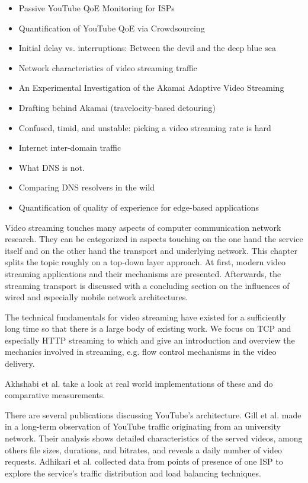 \begin{itemize}
	\item Passive YouTube QoE Monitoring for ISPs \cite{6296879}
	\item Quantification of YouTube QoE via Crowdsourcing \cite{6123395}
	\item Initial delay vs. interruptions: Between the devil and the deep blue sea \cite{6263849}
	\item Network characteristics of video streaming traffic \cite{Rao:2011:NCV:2079296.2079321}
	\item An Experimental Investigation of the Akamai Adaptive Video Streaming \cite{cicco2010akamai}
	\item Drafting behind Akamai (travelocity-based detouring) \cite{Su:2006:DBA:1159913.1159962}
	\item Confused, timid, and unstable: picking a video streaming rate is hard \cite{Huang:2012:CTU:2398776.2398800}
	\item Internet inter-domain traffic \cite{Labovitz:2010:IIT:2043164.1851194}
	\item What DNS is not. \cite{vixie2009dns}
	\item Comparing DNS resolvers in the wild \cite{ager2010comparing}
	\item Quantification of quality of experience for edge-based applications\cite{hossfeld2007quantification}
\end{itemize}

Video streaming touches many aspects of computer communication network research. They can be categorized in aspects touching on the one hand the service itself and on the other hand  the transport and underlying network. This chapter splits the topic roughly on a top-down layer approach. At first, modern video streaming applications and their mechanisms are presented. Afterwards, the streaming transport is discussed with a concluding section on the influences of wired and especially mobile network architectures.


The technical fundamentals for video streaming have existed for a sufficiently long time so that there is a large body of existing work. We focus on TCP and especially HTTP streaming to which \cite{watching-video1} and \cite{ma2011mobile} give an introduction and overview the mechanics involved in streaming, e.g. flow control mechanisms in the video delivery.

Akhshabi et al. \cite{akhshabi2011experimental} take a look at real world implementations of these and do comparative measurements.

There are several publications discussing YouTube's architecture. Gill et al. made in \cite{gill2007youtube} a long-term observation of YouTube traffic originating from an university network. Their analysis shows detailed characteristics of the served videos, among others file sizes, durations, and bitrates, and reveals a daily number of video requests. Adhikari et al. \cite{adhikari2010youtube} collected data from points of presence of one ISP to explore the service's traffic distribution and load balancing techniques.

